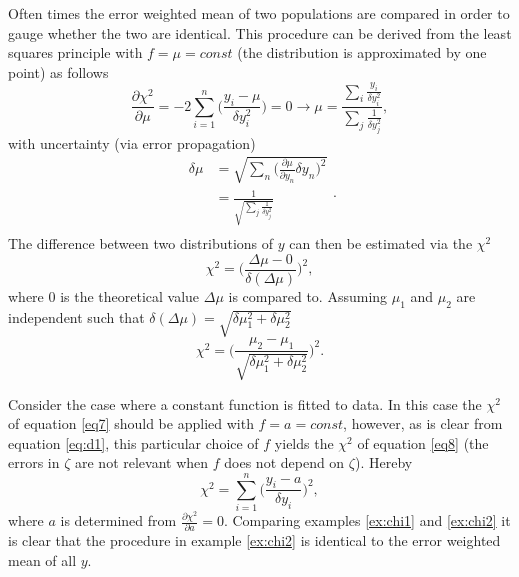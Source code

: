 \begin{example}
	\label{ex:chi1}
	Often times the error weighted mean of two populations are compared in order to gauge whether the two are identical. This procedure can be derived from the least squares principle with $f=\mu=const$ (the distribution is approximated by one point) as follows
	\begin{equation}
		\frac{\partial \chi^2}{\partial \mu} = -2\sum_{i=1}^n\bigg(\frac{y_{i}-\mu}{\delta y_i^2}\bigg)=0 \rightarrow \mu =\frac{\sum_i \frac{y_i}{\delta y_i^2}}{\sum_j \frac{1}{\delta y_j^2}},
		\label{eq9}
	\end{equation}
	with uncertainty (via error propagation)
	\begin{equation}
		\begin{split}
			\delta \mu & = \sqrt{\sum_n\bigg(\frac{\partial \mu}{\partial y_n}\delta y_n\bigg)^2}\\
			& = \frac{1}{\sqrt{\sum_j \frac{1}{\delta y_j^2}}}\\
		\end{split}.
	\end{equation}
	The difference between two distributions of $y$ can then be estimated via the $\chi^2$
	\begin{equation}
		\chi^2 = \bigg(\frac{\Delta \mu-0}{\delta(\Delta\mu)}\bigg)^2,
	\end{equation}
	where $0$ is the theoretical value $\Delta\mu$ is compared to. Assuming $\mu_1$ and $\mu_2$ are independent such that $\delta (\Delta \mu)=\sqrt{\delta \mu_1^2+\delta \mu_2^2}$
	\begin{equation}
		\chi^2 =\bigg(\frac{\mu_2-\mu_1}{\sqrt{\delta \mu_1^2+\delta \mu_2^2}}\bigg)^2.
	\end{equation}
	
\end{example}
\begin{example}
	\label{ex:chi2}
	Consider the case where a constant function is fitted to data. In this case the $\chi^2$ of equation \eqref{eq7} should be applied with $f=a=const$, however, as is clear from equation \eqref{eq:d1}, this particular choice of $f$ yields the $\chi^2$ of equation \eqref{eq8} (the errors in $\zeta$ are not relevant when $f$ does not depend on $\zeta$). Hereby
	\begin{equation}
		\chi^2 =\sum_{i=1}^n\bigg(\frac{y_i-a}{\delta y_i}\bigg)^2,
		\label{eq10}
	\end{equation}
	where $a$ is determined from $\frac{\partial \chi^2}{\partial a}=0$. Comparing examples \ref{ex:chi1} and \ref{ex:chi2} it is clear that the procedure in example \ref{ex:chi2} is identical to the error weighted mean of all $y$. 
\end{example}

